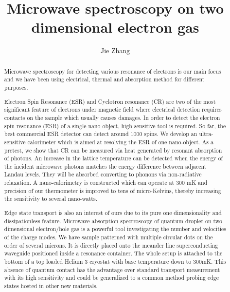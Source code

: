 \documentclass[12pt]{ruthesis}
\title{Microwave spectroscopy on two dimensional electron gas}
\author{Jie Zhang}
\begin{document}
  \begin{frontmatter}
   \maketitle

\begin{abstract}

Microwave spectroscopy for detecting various resonance  of electrons is our main focus and we have been using electrical, thermal and absorption method for different purposes.  

Electron Spin Resonance (ESR) and Cyclotron resonance (CR) are two of the most significant feature of electrons under magnetic field where electrical detection requires contacts on the sample which usually causes damages. In order to detect the electron spin resonance (ESR) of a single nano-object, high sensitive tool is required. So far, the best commercial ESR detector can detect around 1000 spins. We develop an ultra-sensitive calorimeter which is aimed at resolving the ESR of one nano-object. As a pretest, we show that CR can be measured via heat generated by resonant absorption of photons. An increase in the lattice temperature can be detected when the energy of the incident microwave photons matches the energy difference between adjacent Landau levels. They will be absorbed converting to phonons via non-radiative relaxation. A nano-calorimetry is constructed which can operate at 300 mK and precision of our thermometer is improved to tens of micro-Kelvins, thereby increasing the sensitivity to several nano-watts. 

Edge state transport is also an interest of ours due to its pure one dimensionality and dissipationless feature. Microwave absorption spectroscopy of quantum droplet on two dimensional electron/hole gas is a powerful tool investigating the number and velocities of the charge modes. We have sample patterned with multiple circular dots on the order of several microns. It is directly placed onto the meander line superconducting waveguide positioned inside a resonance container. The whole setup is attached to the bottom of a top loaded Helium 3 cryostat with base temperature down to 300mK. This absence of quantum contact has the advantage over standard transport measurement with its high sensitivity and could be generalized to a common method probing edge states hosted in other new materials.


\end{abstract}
\end{frontmatter}
\end{document}
